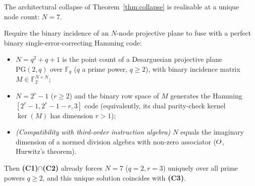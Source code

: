 \begin{theorembox}
The architectural collapse of Theorem~\ref{thm:collapse} is realisable at a
unique node count: $N=7$.
\end{theorembox}

\begin{theorem}\label{thm:unique}
Require the binary incidence of an $N$-node projective plane to fuse with a
perfect binary single-error-correcting Hamming code:
\begin{itemize}[leftmargin=1.6em,itemsep=0pt]
  \item[\textbf{(C1)}] $N=q^2+q+1$ is the point count of a Desarguesian
        projective plane $\mathrm{PG}(2,q)$ over $\mathbb{F}_q$ ($q$ a prime
        power, $q\ge 2$), with binary incidence matrix $M\in\mathbb{F}_2^{N\times N}$;
  \item[\textbf{(C2)}] $N=2^r-1$ ($r\ge 2$) and the binary row space of $M$
        generates the Hamming $[2^r{-}1, 2^r{-}1{-}r, 3]$ code (equivalently,
        its dual parity-check kernel $\ker(M)$ has dimension $r > 1$);
  \item[\textbf{(C3)}] \emph{(Compatibility with third-order instruction algebra)}
        $N$ equals the imaginary dimension of a normed division algebra with
        non-zero associator ($O$, Hurwitz's theorem).
\end{itemize}
Then \textbf{(C1)}$\cap$\textbf{(C2)} already forces $N=7$ ($q=2, r=3$)
uniquely over all prime powers $q\ge 2$, and this unique solution coincides
with \textbf{(C3)}.
\end{theorem}

